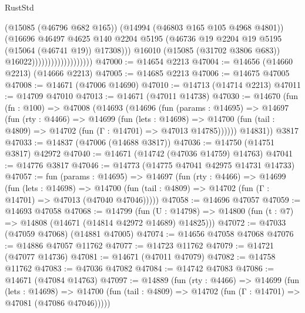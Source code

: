 \begin{lexlean}{RustStd}
\begin{coremodule}
                                            (@15085 (@46796 @682 @165))
                                            (@14994 (@46803 @165 @105 @4968 @4801))
                                            (@16696
                                              @46497
                                              @4625
                                              @140
                                              @2204
                                              @5195
                                              (@46736
                                                @19
                                                @2204
                                                @19
                                                @5195
                                                (@15064 (@46741 @19))
                                                @17308)))
                                          @16010
                                          (@15085 (@31702 @3806 @683))
                                          @16022)))))))))))))))))))
@47000 := @14654 @2213
@47004 := @14656 (@14660 @2213) (@14666 @2213)
@47005 := @14685 @2213
@47006 := @14675 @47005
@47008 := @14671 (@47006 @14690)
@47010 := @14713 (@14714 @2213)
@47011 := @14709 @47010
@47013 := @14671 (@47011 @14738)
@47030 := @14670
    (fun (fn : @100) =>
    @47008
      (@14693
        (@14696
          (fun (params : @14695) =>
          @14697
            (fun (rty : @4466) =>
            @14699
              (fun (lets : @14698) =>
              @14700 (fun (tail : @4809) => @14702 (fun (Γ : @14701) => @47013 @14785))))))
        @14831))
    @3817
@47033 := @14837 (@47006 (@14688 @3817))
@47036 := @14750 (@14751 @3817) @42972
@47040 := @14671 (@14742 (@47036 @14759) @14763)
@47041 := @14776 @3817
@47046 := @14773 (@14775 @47041 @42975 @14731 @14733)
@47057 := fun (params : @14695) =>
  @14697
    (fun (rty : @4466) =>
    @14699
      (fun (lets : @14698) =>
      @14700 (fun (tail : @4809) => @14702 (fun (Γ : @14701) => @47013 (@47040 @47046)))))
@47058 := @14696 @47057
@47059 := @14693 @47058
@47068 := @14799
    (fun (U : @14798) => @14800 (fun (t : @7) => @14808 (@14671 (@14814 @42972 @14689) @14825)))
@47072 := @47033 (@47059 @47068) (@14881 @47005)
@47074 := @14656 @47058 @47068
@47076 := @14886 @47057 @11762
@47077 := @14723 @11762
@47079 := @14721 (@47077 @14736)
@47081 := @14671 (@47011 @47079)
@47082 := @14758 @11762
@47083 := @47036 @47082
@47084 := @14742 @47083
@47086 := @14671 (@47084 @14763)
@47097 := @14889
    (fun (rty : @4466) =>
    @14699
      (fun (lets : @14698) =>
      @14700 (fun (tail : @4809) => @14702 (fun (Γ : @14701) => @47081 (@47086 @47046)))))

\end{coremodule}
\end{lexlean}
